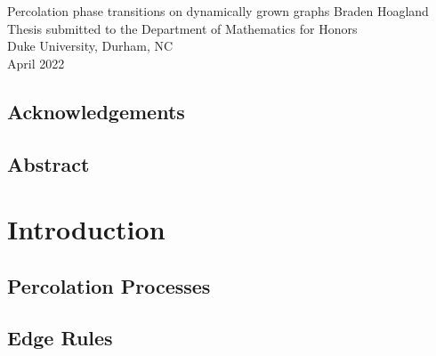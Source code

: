\documentclass[twoside,10pt]{article}
\begin{document}


\formalTitle
{Percolation phase transitions on dynamically grown graphs}
{Braden Hoagland}
{
	Thesis submitted to the Department of Mathematics for Honors\\
        Duke University, Durham, NC\\
        April 2022
}


\subsection*{Acknowledgements}
\lipsum[1]


\subsection*{Abstract}
\lipsum[2]

\thispagestyle{empty}
\tableofcontents
\newpage



\section{Introduction}

\subsection{Percolation Processes}

\subsection{Edge Rules}
\end{document}
